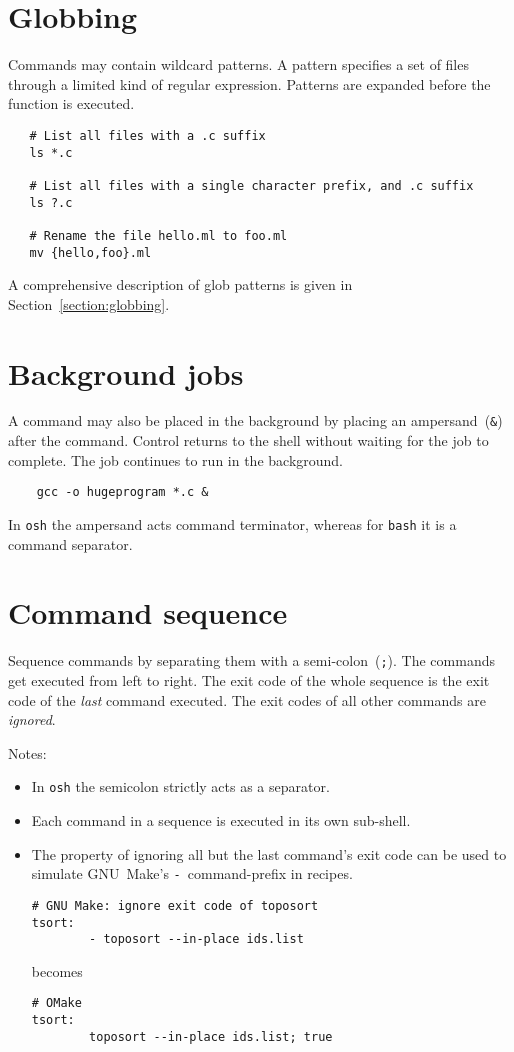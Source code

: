 \section{Globbing}

Commands may contain wildcard patterns.  A pattern specifies a set of files through a limited kind
of regular expression.  Patterns are expanded before the function is executed.

\begin{verbatim}
   # List all files with a .c suffix
   ls *.c

   # List all files with a single character prefix, and .c suffix
   ls ?.c

   # Rename the file hello.ml to foo.ml
   mv {hello,foo}.ml
\end{verbatim}

A comprehensive description of \OMake{} glob patterns is given in Section~\ref{section:globbing}.

\section{Background jobs}

A command may also be placed in the background by placing an ampersand~(\verb+&+) after the command.
Control returns to the shell without waiting for the job to complete.  The job continues to run in
the background.

\begin{verbatim}
    gcc -o hugeprogram *.c &
\end{verbatim}

In \verb+osh+ the ampersand acts command terminator, whereas for \verb+bash+ it is a command
separator.

\section{Command sequence}\label{section:command-sequence}

Sequence commands by separating them with a semi-colon~(\verb+;+).  The commands get executed from
left to right.  The exit code of the whole sequence is the exit code of the \emph{last} command
executed.  The exit codes of all other commands are \emph{ignored}.

Notes:

\begin{itemize}
  \item In \verb+osh+ the semicolon strictly acts as a separator.
  \item Each command in a sequence is executed in its own sub-shell.
  \item The property of ignoring all but the last command's exit code can be used to simulate
    GNU~Make's \verb+-+~command-prefix in recipes.
\begin{verbatim}
# GNU Make: ignore exit code of toposort
tsort:
        - toposort --in-place ids.list
\end{verbatim}
    becomes
\begin{verbatim}
# OMake
tsort:
        toposort --in-place ids.list; true
\end{verbatim}
\end{itemize}

